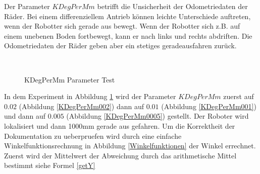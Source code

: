 \documentclass{article}
\begin{document}
\newpage
Der Parameter $KDegPerMm$ betrifft die Unsicherheit der Odometriedaten der R\"ader. Bei einem differenziellem Antrieb k\"onnen leichte Unterschiede auftreten, wenn der Robotter sich gerade aus bewegt. Wenn der Robotter sich z.B. auf einem unebenen Boden fortbewegt, kann er nach links und rechts abdriften. Die Odometriedaten der R\"ader geben aber ein stetiges geradeausfahren zur\"uck.

\begin{figure}
  \centering
  \ 
  \ 
  \caption{KDegPerMm Parameter Test}
  \label{KDegPerMmTestFigure}
\end{figure}
In dem Experiment in Abbildung \ref{KDegPerMmTestFigure} wird der Parameter $KDegPerMm$ zuerst auf $0.02$ (Abbildung \ref{KDegPerMm002}) dann auf $0.01$ (Abbildung \ref{KDegPerMm001}) und dann auf $0.005$ (Abbildung \ref{KDegPerMm0005}) gestellt. Der Roboter wird lokalisiert und dann 1000mm gerade aus gefahren. Um die Korrektheit der Dokumentation zu ueberpruefen wird
durch eine einfache Winkelfunktionsrechnung in Abbildung \ref{Winkelfunktionen} der Winkel errechnet. 
Zuerst wird der Mittelwert der Abweichung durch das arithmetische Mittel bestimmt siehe Formel \ref{getY}
\end{document}
